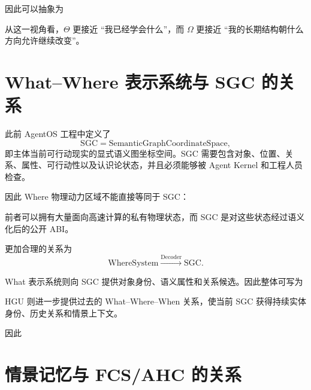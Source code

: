 因此可以抽象为
\begin{statementbox}
\centering
{}
\end{statementbox}

从这一视角看，$\Theta$ 更接近 ``我已经学会什么''，而 $\Omega$ 更接近 ``我的长期结构朝什么方向允许继续改变''。

\section{What--Where 表示系统与 SGC 的关系}

此前 AgentOS 工程中定义了
\[
\mathrm{SGC}
=
\mathrm{SemanticGraphCoordinateSpace},
\]
即主体当前可行动现实的显式语义图坐标空间。SGC 需要包含对象、位置、关系、属性、可行动性以及认识论状态，并且必须能够被 Agent Kernel 和工程人员检查。

因此 Where 物理动力区域不能直接等同于 SGC：
\begin{statementbox}
\centering
{}
\end{statementbox}

前者可以拥有大量面向高速计算的私有物理状态，而 SGC 是对这些状态经过语义化后的公开 ABI。

更加合理的关系为
\[
\mathrm{WhereSystem}
\xrightarrow{\mathrm{Decoder}}
\mathrm{SGC}.
\]

What 表示系统则向 SGC 提供对象身份、语义属性和关系候选。因此整体可写为
\begin{statementbox}
\centering
{}
\end{statementbox}

HGU 则进一步提供过去的 What--Where--When 关系，使当前 SGC 获得持续实体身份、历史关系和情景上下文。

因此
\begin{statementbox}
\centering
{}
\end{statementbox}

\section{情景记忆与 FCS/AHC 的关系}

